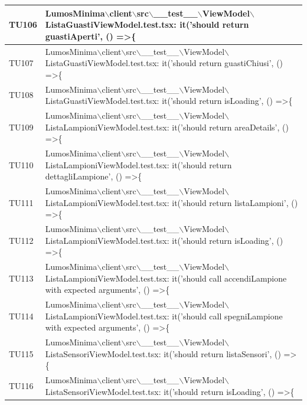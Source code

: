 \documentclass[12pt]{article}
\begin{document}
\begin{xltabular}{\linewidth}{|>{\hsize}X|X|}
	TU106 & LumosMinima$\backslash$client$\backslash$src$\backslash$\_\_test\_\_$\backslash$ViewModel$\backslash$ListaGuastiViewModel.test.tsx: it('should return guastiAperti', () =\textgreater \{ \\ \hline
	TU107 & LumosMinima$\backslash$client$\backslash$src$\backslash$\_\_test\_\_$\backslash$ViewModel$\backslash$ListaGuastiViewModel.test.tsx: it('should return guastiChiusi', () =\textgreater \{ \\ \hline
	TU108 & LumosMinima$\backslash$client$\backslash$src$\backslash$\_\_test\_\_$\backslash$ViewModel$\backslash$ListaGuastiViewModel.test.tsx: it('should return isLoading', () =\textgreater \{ \\ \hline
	TU109 & LumosMinima$\backslash$client$\backslash$src$\backslash$\_\_test\_\_$\backslash$ViewModel$\backslash$ListaLampioniViewModel.test.tsx: it('should return areaDetails', () =\textgreater \{ \\ \hline
	TU110 & LumosMinima$\backslash$client$\backslash$src$\backslash$\_\_test\_\_$\backslash$ViewModel$\backslash$ListaLampioniViewModel.test.tsx: it('should return dettagliLampione', () =\textgreater \{ \\ \hline
	TU111 & LumosMinima$\backslash$client$\backslash$src$\backslash$\_\_test\_\_$\backslash$ViewModel$\backslash$ListaLampioniViewModel.test.tsx: it('should return listaLampioni', () =\textgreater \{ \\ \hline
	TU112 & LumosMinima$\backslash$client$\backslash$src$\backslash$\_\_test\_\_$\backslash$ViewModel$\backslash$ListaLampioniViewModel.test.tsx: it('should return isLoading', () =\textgreater \{ \\ \hline
	TU113 & LumosMinima$\backslash$client$\backslash$src$\backslash$\_\_test\_\_$\backslash$ViewModel$\backslash$ListaLampioniViewModel.test.tsx: it('should call accendiLampione with expected arguments', () =\textgreater \{ \\ \hline
	TU114 & LumosMinima$\backslash$client$\backslash$src$\backslash$\_\_test\_\_$\backslash$ViewModel$\backslash$ListaLampioniViewModel.test.tsx: it('should call spegniLampione with expected arguments', () =\textgreater \{ \\ \hline
	TU115 & LumosMinima$\backslash$client$\backslash$src$\backslash$\_\_test\_\_$\backslash$ViewModel$\backslash$ListaSensoriViewModel.test.tsx: it('should return listaSensori', () =\textgreater \{ \\ \hline
	TU116 & LumosMinima$\backslash$client$\backslash$src$\backslash$\_\_test\_\_$\backslash$ViewModel$\backslash$ListaSensoriViewModel.test.tsx: it('should return isLoading', () =\textgreater \{ \\ \hline

\end{xltabular}
\end{document}
